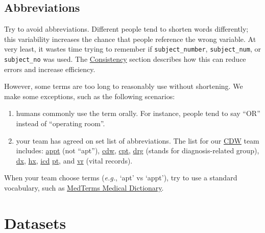 \documentclass[
]{book}
\begin{document}
\hypertarget{style-abbreviation}{%
\subsection{Abbreviations}\label{style-abbreviation}}

Try to avoid abbreviations. Different people tend to shorten words differently; this variability increases the chance that people reference the wrong variable. At very least, it wastes time trying to remember if \texttt{subject\_number}, \texttt{subject\_num}, or \texttt{subject\_no} was used. The \protect\hyperlink{architecture-consistency}{Consistency} section describes how this can reduce errors and increase efficiency.

However, some terms are too long to reasonably use without shortening. We make some exceptions, such as the following scenarios:

\begin{enumerate}
\def\labelenumi{\arabic{enumi}.}
\item
  humans commonly use the term orally. For instance, people tend to say ``OR'' instead of ``operating room''.
\item
  your team has agreed on set list of abbreviations. The list for our \href{https://github.com/OuhscBbmc/prairie-outpost-public\#readme}{CDW} team includes:
  \href{https://www.merriam-webster.com/dictionary/appointment}{appt} (not ``apt''),
  \href{https://en.wikipedia.org/wiki/Clinical_data_repository}{cdw},
  \href{https://en.wikipedia.org/wiki/Current_Procedural_Terminology}{cpt},
  \href{https://en.wikipedia.org/wiki/Diagnosis-related_group}{drg} (stands for diagnosis-related group),
  \href{https://www.medicinenet.com/script/main/art.asp?articlekey=33829}{dx},
  \href{https://medical-dictionary.thefreedictionary.com/Hx}{hx},
  \href{https://www.cdc.gov/nchs/icd/icd10cm.htm}{icd}
  \href{https://www.medicinenet.com/script/main/art.asp?articlekey=39154}{pt}, and
  \href{https://www.ok.gov/health/Birth_and_Death_Certificates/}{vr} (vital records).
\end{enumerate}

When your team choose terms (\emph{e.g.}, `apt' vs `appt'), try to use a standard vocabulary, such as \href{https://www.medicinenet.com/medterms-medical-dictionary/article.htm}{MedTerms Medical Dictionary}.

\hypertarget{datasets}{%
\section{Datasets}\label{datasets}}
\end{document}
